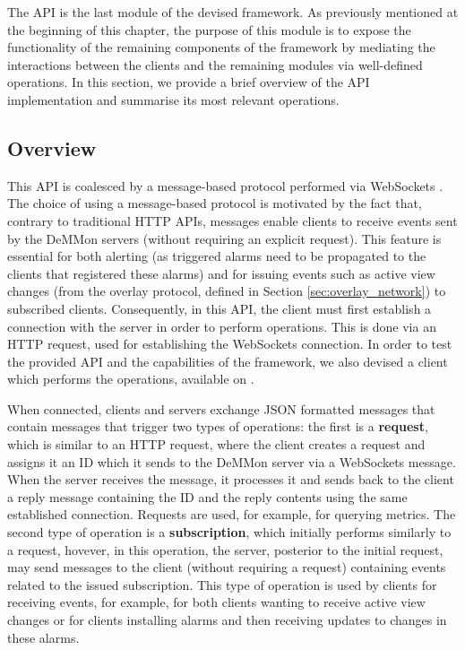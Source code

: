 
The API is the last module of the devised framework. As previously mentioned at the beginning of this chapter, the purpose of this module is to expose the functionality of the remaining components of the framework by mediating the interactions between the clients and the remaining modules via well-defined operations. In this section, we provide a brief overview of the API implementation and summarise its most relevant operations. 

\subsection{Overview}

This API is coalesced by a message-based protocol performed via WebSockets \cite{websocketsRFC}. The choice of using a message-based protocol is motivated by the fact that, contrary to traditional HTTP APIs, messages enable clients to receive events sent by the DeMMon servers (without requiring an explicit request). This feature is essential for both alerting (as triggered alarms need to be propagated to the clients that registered these alarms) and for issuing events such as active view changes (from the overlay protocol, defined in Section \ref{sec:overlay_network}) to subscribed clients. Consequently, in this API, the client must first establish a connection with the server in order to perform operations. This is done via an HTTP request, used for establishing the WebSockets connection. In order to test the provided API and the capabilities of the framework, we also devised a client which performs the operations, available on \cite{demmon-client-repo}.

When connected, clients and servers exchange JSON formatted messages that contain messages that trigger two types of operations: the first is a \textbf{request}, which is similar to an HTTP request, where the client creates a request and assigns it an ID which it sends to the DeMMon server via a WebSockets message. When the server receives the message, it processes it and sends back to the client a reply message containing the ID and the reply contents using the same established connection. Requests are used, for example, for querying metrics. The second type of operation is a \textbf{subscription}, which initially performs similarly to a request, hovever, in this operation, the server, posterior to the initial request, may send messages to the client (without requiring a request) containing events related to the issued subscription. This type of operation is used by clients for receiving events, for example, for both clients wanting to receive active view changes or for clients installing alarms and then receiving updates to changes in these alarms.

